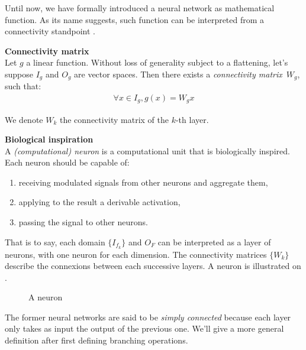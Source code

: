 
Until now, we have formally introduced a neural network as mathematical function. As its name suggests, such function can be interpreted from a connectivity standpoint \citep{lecun-87}.

\begin{definition}\textbf{Connectivity matrix}\\
Let $g$ a linear function. Without loss of generality subject to a flattening, let's suppose $I_g$ and $O_g$ are vector spaces. Then there exists a \emph{connectivity matrix}~$W_g$, such that:
\begin{gather*}
\forall x \in I_g, g(x) = W_g x
\end{gather*}
\end{definition}
We denote $W_k$ the connectivity matrix of the $k$-th layer.

\begin{remark}\textbf{Biological inspiration}\\
A \emph{(computational) neuron} is a computational unit that is biologically inspired. Each neuron should be capable of:
\begin{enumerate}
\item receiving modulated signals from other neurons and aggregate them,
\item applying to the result a derivable activation,
\item passing the signal to other neurons.
\end{enumerate}
That is to say, each domain $\{I_{f_k}\}$ and $O_F$ can be interpreted as a layer of neurons, with one neuron for each dimension. The connectivity matrices $\{W_k\}$ describe the connexions between each successive layers.
A neuron is illustrated on .
\end{remark}

\begin{figure}[H]
\centering
{}
\caption{A neuron}
\label{fig:neuron}
\end{figure}


The former neural networks are said to be \emph{simply connected} because each layer only takes as input the output of the previous one. We'll give a more general definition after first defining branching operations.

